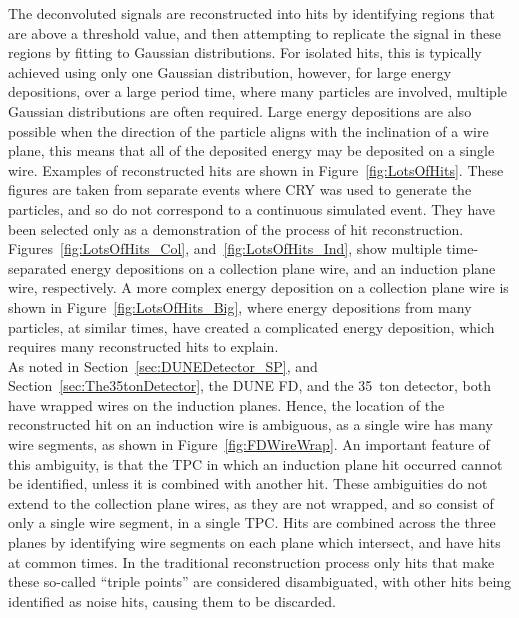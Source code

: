 The deconvoluted signals are reconstructed into hits by identifying regions that are above a threshold value, and then attempting to replicate the signal in these regions by fitting to Gaussian distributions. For isolated hits, this is typically achieved using only one Gaussian distribution, however, for large energy depositions, over a large period time, where many particles are involved, multiple Gaussian distributions are often required. Large energy depositions are also possible when the direction of the particle aligns with the inclination of a wire plane, this means that all of the deposited energy may be deposited on a single wire. Examples of reconstructed hits are shown in Figure~\ref{fig:LotsOfHits}. These figures are taken from separate events where CRY was used to generate the particles, and so do not correspond to a continuous simulated event. They have been selected only as a demonstration of the process of hit reconstruction. Figures~\ref{fig:LotsOfHits_Col}, and~\ref{fig:LotsOfHits_Ind}, show multiple time-separated energy depositions on a collection plane wire, and an induction plane wire, respectively. A more complex energy deposition on a collection plane wire is shown in Figure~\ref{fig:LotsOfHits_Big}, where energy depositions from many particles, at similar times, have created a complicated energy deposition, which requires many reconstructed hits to explain. \\

As noted in Section~\ref{sec:DUNEDetector_SP}, and Section~\ref{sec:The35tonDetector}, the DUNE FD, and the 35~ton detector, both have wrapped wires on the induction planes. Hence, the location of the reconstructed hit on an induction wire is ambiguous, as a single wire has many wire segments, as shown in Figure~\ref{fig:FDWireWrap}. An important feature of this ambiguity, is that the TPC in which an induction plane hit occurred cannot be identified, unless it is combined with another hit. These ambiguities do not extend to the collection plane wires, as they are not wrapped, and so consist of only a single wire segment, in a single TPC. Hits are combined across the three planes by identifying wire segments on each plane which intersect, and have hits at common times. In the traditional reconstruction process only hits that make these so-called ``triple points'' are considered disambiguated, with other hits being identified as noise hits, causing them to be discarded. \\

